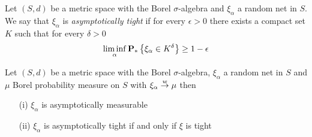 \begin{defn}\label{defn:AsymptoticTightness}Let $(S,d)$ be a metric space with the Borel $\sigma$-algebra and $\xi_\alpha$ a random net in $S$.  We say that $\xi_\alpha$ is \emph{asymptotically tight} if for every $\epsilon > 0$ there exists a compact set $K$ such that for every $\delta > 0$ 
\begin{align*}
\liminf_{\alpha} \textbf{P}_* \left \{\xi_\alpha \in K^\delta \right \} \geq 1 - \epsilon
\end{align*}
\end{defn}

\begin{prop}Let $(S,d)$ be a metric space  with the Borel $\sigma$-algebra, $\xi_\alpha$ a random net in $S$ and $\mu$ Borel probability measure on $S$ with $\xi_\alpha \overset{w}\to \mu$ then
\begin{itemize}
\item[(i)] $\xi_\alpha$ is asymptotically measurable
\item[(ii)] $\xi_\alpha$ is asymptotically tight if and only if $\xi$ is tight
\end{itemize}
\end{prop}
